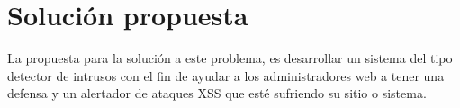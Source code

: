 \section{Solución propuesta}
La propuesta para la solución a este problema, es desarrollar un sistema del tipo detector de intrusos con el fin de ayudar a los administradores web a tener una defensa y un alertador de ataques XSS que esté sufriendo su sitio o sistema.\\